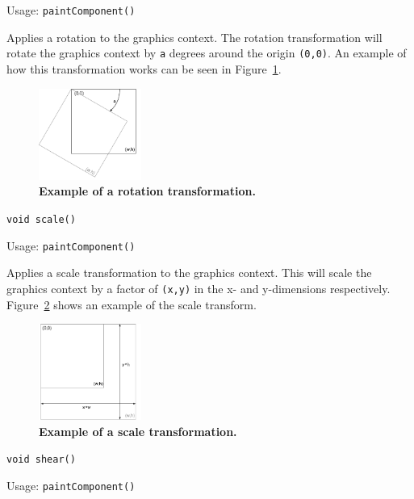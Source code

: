 \documentclass[a4paper, 10pt]{report}
\begin{document}
Usage: {\tt paintComponent()}

Applies a rotation to the graphics context. The rotation transformation will rotate the graphics context by {\tt a} degrees around the origin {\tt (0,0)}. An example of how this transformation works can be seen in Figure~\ref{fig:Rotate}.

\begin{figure}[htbp]
\begin{center}
\includegraphics[width=0.3\textwidth]{rotation}
\caption{{\bf Example of a rotation transformation.}}
\label{fig:Rotate}
\end{center}
\end{figure}

\hrulefill

{\large {\tt void scale()}}

Usage: {\tt paintComponent()}

Applies a scale transformation to the graphics context. This will scale the graphics context by a factor of {\tt (x,y)} in the x- and y-dimensions respectively. Figure~\ref{fig:Scale} shows an example of the scale transform.

\begin{figure}[h!]
\begin{center}
\includegraphics[width=0.3\textwidth]{scale}
\caption{{\bf Example of a scale transformation.}}
\label{fig:Scale}
\end{center}
\end{figure}

\hrulefill

{\large {\tt void shear()}}

Usage: {\tt paintComponent()}
\end{document}
